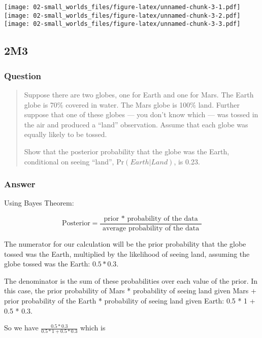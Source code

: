 \documentclass[
]{book}
\begin{document}
\texttt{[image: 02-small\_worlds\_files/figure-latex/unnamed-chunk-3-1.pdf]} \texttt{[image: 02-small\_worlds\_files/figure-latex/unnamed-chunk-3-2.pdf]} \texttt{[image: 02-small\_worlds\_files/figure-latex/unnamed-chunk-3-3.pdf]}

\hypertarget{m3}{%
\subsection*{2M3}\label{m3}}

\hypertarget{question-6}{%
\subsubsection*{Question}\label{question-6}}

\begin{quote}
Suppose there are two globes, one for Earth and one for Mars. The Earth globe is 70\% covered in water. The Mars globe is 100\% land. Further suppose that one of these globes --- you don't know which --- was tossed in the air and produced a ``land'' observation. Assume that each globe was equally likely to be tossed.

Show that the posterior probability that the globe was the Earth, conditional on seeing ``land'', \(\text{Pr}(Earth | Land)\), is 0.23.
\end{quote}

\hypertarget{answer-6}{%
\subsubsection*{Answer}\label{answer-6}}

Using Bayes Theorem:

\[
\text{Posterior} = \frac{\text{ prior * probability of the data }}{\text{ average probability of the data }}
\]

The numerator for our calculation will be the prior probability that the globe tossed was the Earth, multiplied by the likelihood of seeing land, assuming the globe tossed was the Earth: \(0.5 * 0.3\).

The denominator is the sum of these probabilities over each value of the prior. In this case, the prior probability of Mars * probability of seeing land given Mars + prior probability of the Earth * probability of seeing land given Earth: 0.5 * 1 + 0.5 * 0.3.

So we have \(\frac{ 0.5 * 0.3 } { 0.5 * 1 + 0.5 * 0.3 }\) which is
\end{document}
